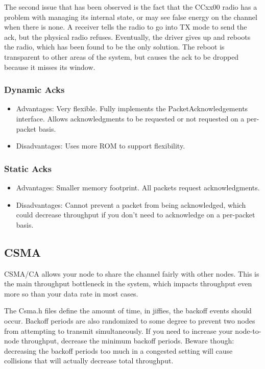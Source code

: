\documentclass{article}
\begin{document}
The second issue that has been observed is the fact that the CCxx00 radio has a problem with managing
its internal state, or may see false energy on the channel when there is none. A receiver tells the
radio to go into TX mode to send the ack, but the physical radio refuses. Eventually, the driver 
gives up and reboots the radio, which has been found to be the only solution. The reboot is 
transparent to other areas of the system, but causes the ack to be dropped because it misses its window.

\subsubsection{Dynamic Acks}
\begin{itemize}
  \item Advantages: Very flexible. Fully implements the PacketAcknowledgements interface. 
  Allows acknowledgments to be requested or not requested on a per-packet basis.
  \item Disadvantages: Uses more ROM to support flexibility.
\end{itemize}

\subsubsection{Static Acks}
\begin{itemize}
  \item Advantages: Smaller memory footprint. All packets request acknowledgments.
  \item Disadvantages: Cannot prevent a packet from being acknowledged, which could 
  decrease throughput if you don't need to acknowledge on a per-packet basis.
\end{itemize}

\subsection{CSMA}
\label{sec:csma}
CSMA/CA allows your node to share the channel fairly with other nodes.
This is the main throughput bottleneck in the system, which impacts
throughput even more so than your data rate in most cases. 

The Csma.h files define the amount of time, in jiffies, the backoff
events should occur.  Backoff periods are also randomized to some
degree to prevent two nodes from attempting to transmit simultaneously.
If you need to increase your node-to-node throughput, decrease the minimum backoff periods. Beware though: decreasing the backoff periods
too much in a congested setting will cause collisions that will actually
decrease total throughput. 
\end{document}
